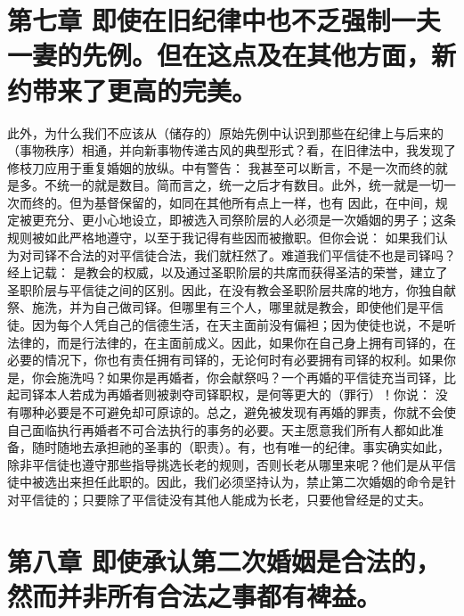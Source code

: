 
\section{第七章 即使在旧纪律中也不乏强制一夫一妻的先例。但在这点及在其他方面，新约带来了更高的完美。}

此外，为什么我们不应该从（储存的）原始先例中认识到那些在纪律上与后来的（事物秩序）相通，并向新事物传递古风的典型形式？看，在旧律法中，我发现了修枝刀应用于重复婚姻的放纵。中有警告： 我甚至可以断言，不是一次而终的就是多。不统一的就是数目。简而言之，统一之后才有数目。此外，统一就是一切一次而终的。但为基督保留的，如同在其他所有点上一样，也有 因此，在中间，规定被更充分、更小心地设立，即被选入司祭阶层的人必须是一次婚姻的男子；这条规则被如此严格地遵守，以至于我记得有些因而被撤职。但你会说： 如果我们认为对司铎不合法的对平信徒合法，我们就枉然了。难道我们平信徒不也是司铎吗？经上记载： 是教会的权威，以及通过圣职阶层的共席而获得圣洁的荣誉，建立了圣职阶层与平信徒之间的区别。因此，在没有教会圣职阶层共席的地方，你独自献祭、施洗，并为自己做司铎。但哪里有三个人，哪里就是教会，即使他们是平信徒。因为每个人凭自己的信德生活，在天主面前没有偏袒；因为使徒也说，不是听法律的，而是行法律的，在主面前成义。因此，如果你在自己身上拥有司铎的，在必要的情况下，你也有责任拥有司铎的，无论何时有必要拥有司铎的权利。如果你是，你会施洗吗？如果你是再婚者，你会献祭吗？一个再婚的平信徒充当司铎，比起司铎本人若成为再婚者则被剥夺司铎职权，是何等更大的（罪行）！你说： 没有哪种必要是不可避免却可原谅的。总之，避免被发现有再婚的罪责，你就不会使自己面临执行再婚者不可合法执行的事务的必要。天主愿意我们所有人都如此准备，随时随地去承担祂的圣事的（职责）。有，也有唯一的纪律。事实确实如此，除非平信徒也遵守那些指导挑选长老的规则，否则长老从哪里来呢？他们是从平信徒中被选出来担任此职的。因此，我们必须坚持认为，禁止第二次婚姻的命令是针对平信徒的；只要除了平信徒没有其他人能成为长老，只要他曾经是的丈夫。\par


\section{第八章 即使承认第二次婚姻是合法的，然而并非所有合法之事都有裨益。}

